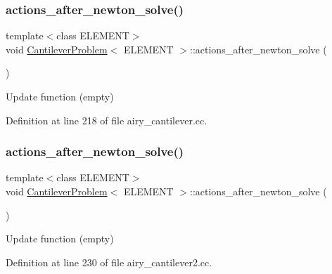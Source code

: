 \subsubsection{\texorpdfstring{actions\+\_\+after\+\_\+newton\+\_\+solve()}{actions\_after\_newton\_solve()}\hspace{0.1cm}{\footnotesize\ttfamily [1/2]}}
{\footnotesize\ttfamily template$<$class E\+L\+E\+M\+E\+NT$>$ \\
void \hyperlink{classCantileverProblem}{Cantilever\+Problem}$<$ E\+L\+E\+M\+E\+NT $>$\+::actions\+\_\+after\+\_\+newton\+\_\+solve (\begin{DoxyParamCaption}{ }\end{DoxyParamCaption})\hspace{0.3cm}{\ttfamily [inline]}}



Update function (empty) 



Definition at line 218 of file airy\+\_\+cantilever.\+cc.

\mbox{\label{classCantileverProblem_a4a70a4328d287aaa15c7811562122013}} 
\subsubsection{\texorpdfstring{actions\+\_\+after\+\_\+newton\+\_\+solve()}{actions\_after\_newton\_solve()}\hspace{0.1cm}{\footnotesize\ttfamily [2/2]}}
{\footnotesize\ttfamily template$<$class E\+L\+E\+M\+E\+NT$>$ \\
void \hyperlink{classCantileverProblem}{Cantilever\+Problem}$<$ E\+L\+E\+M\+E\+NT $>$\+::actions\+\_\+after\+\_\+newton\+\_\+solve (\begin{DoxyParamCaption}{ }\end{DoxyParamCaption})\hspace{0.3cm}{\ttfamily [inline]}}



Update function (empty) 



Definition at line 230 of file airy\+\_\+cantilever2.\+cc.

\mbox{\label{classCantileverProblem_a50f8964219c507562945655e0ed5fc23}} 
